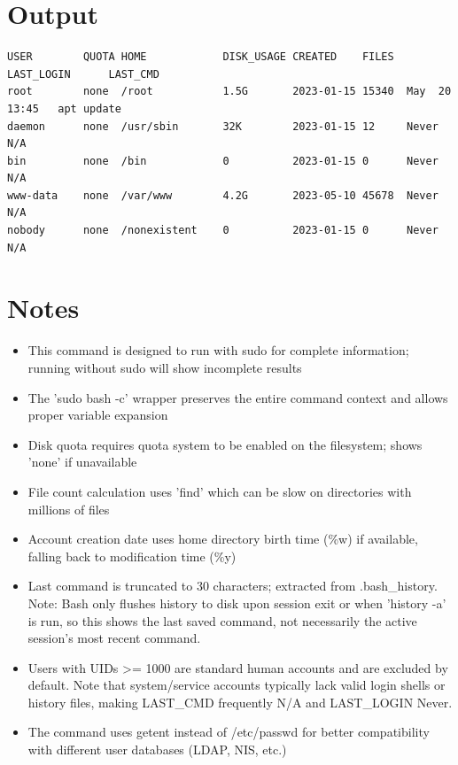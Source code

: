 \documentclass{article}
\begin{document}
\begin{enumerate}
\end{enumerate}

\section*{Output}
\begin{lstlisting}
USER        QUOTA HOME            DISK_USAGE CREATED    FILES  LAST_LOGIN      LAST_CMD
root        none  /root           1.5G       2023-01-15 15340  May  20 13:45   apt update
daemon      none  /usr/sbin       32K        2023-01-15 12     Never           N/A
bin         none  /bin            0          2023-01-15 0      Never           N/A
www-data    none  /var/www        4.2G       2023-05-10 45678  Never           N/A
nobody      none  /nonexistent    0          2023-01-15 0      Never           N/A
\end{lstlisting}

\section*{Notes}
\begin{itemize}
  \item This command is designed to run with sudo for complete information; running without sudo will show incomplete results
  \item The 'sudo bash -c' wrapper preserves the entire command context and allows proper variable expansion
  \item Disk quota requires quota system to be enabled on the filesystem; shows 'none' if unavailable
  \item File count calculation uses 'find' which can be slow on directories with millions of files
  \item Account creation date uses home directory birth time (\%w) if available, falling back to modification time (\%y)
  \item Last command is truncated to 30 characters; extracted from .bash\_history. Note: Bash only flushes history to disk upon session exit or when 'history -a' is run, so this shows the last saved command, not necessarily the active session's most recent command.
  \item Users with UIDs >= 1000 are standard human accounts and are excluded by default. Note that system/service accounts typically lack valid login shells or history files, making LAST\_CMD frequently N/A and LAST\_LOGIN Never.
  \item The command uses getent instead of /etc/passwd for better compatibility with different user databases (LDAP, NIS, etc.)
\end{itemize}
\end{document}
